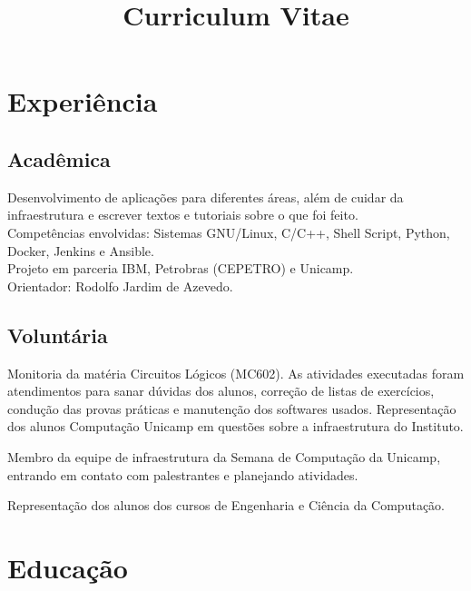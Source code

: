 \documentclass[10pt, a4paper, roman]{moderncv} %
\title{Curriculum Vitae}
\begin{document}
\makecvtitle %

\section{Experiência}

\subsection{Acadêmica}
{
    Desenvolvimento de aplicações para diferentes áreas, além de cuidar da infraestrutura e escrever textos e tutoriais sobre o que foi 
    feito.\\ 
    Competências envolvidas: Sistemas GNU/Linux, C/C++, Shell Script, Python, Docker, Jenkins e Ansible.\\ 
    Projeto em parceria IBM, Petrobras (CEPETRO) e Unicamp.\\
    Orientador: Rodolfo Jardim de Azevedo.
}

\bigskip

\subsection{Voluntária}
{
    Monitoria da matéria Circuitos Lógicos (MC602). As atividades executadas foram atendimentos para sanar dúvidas 
    dos alunos, correção de listas de exercícios, condução das provas práticas e manutenção dos softwares usados.
}
{
Representação dos alunos Computação Unicamp em questões sobre a 
    infraestrutura do Instituto.
}

{
Membro da equipe de infraestrutura da Semana de Computação da Unicamp, entrando em contato com palestrantes e planejando atividades.
}

{
Representação dos alunos dos cursos de Engenharia e Ciência da Computação.
}

\section{Educação}
\end{document}

